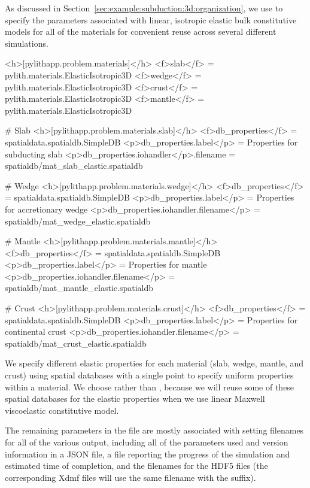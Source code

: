 As discussed in Section~\vref{sec:example:subduction:3d:organization},
we use  to specify the parameters
associated with linear, isotropic elastic bulk constitutive models for
all of the materials for convenient reuse across several different
simulations.
\begin{cfg}
<h>[pylithapp.problem.materials]</h>
<f>slab</f> = pylith.materials.ElasticIsotropic3D
<f>wedge</f> = pylith.materials.ElasticIsotropic3D
<f>crust</f> = pylith.materials.ElasticIsotropic3D
<f>mantle</f> = pylith.materials.ElasticIsotropic3D

# Slab
<h>[pylithapp.problem.materials.slab]</h>
<f>db_properties</f> = spatialdata.spatialdb.SimpleDB
<p>db_properties.label</p> = Properties for subducting slab
<p>db_properties.iohandler</p>.filename = spatialdb/mat_slab_elastic.spatialdb

# Wedge
<h>[pylithapp.problem.materials.wedge]</h>
<f>db_properties</f> = spatialdata.spatialdb.SimpleDB
<p>db_properties.label</p> = Properties for accretionary wedge
<p>db_properties.iohandler.filename</p> = spatialdb/mat_wedge_elastic.spatialdb

# Mantle
<h>[pylithapp.problem.materials.mantle]</h>
<f>db_properties</f> = spatialdata.spatialdb.SimpleDB
<p>db_properties.label</p> = Properties for mantle
<p>db_properties.iohandler.filename</p> = spatialdb/mat_mantle_elastic.spatialdb

# Crust
<h>[pylithapp.problem.materials.crust]</h>
<f>db_properties</f> = spatialdata.spatialdb.SimpleDB
<p>db_properties.label</p> = Properties for continental crust
<p>db_properties.iohandler.filename</p> = spatialdb/mat_crust_elastic.spatialdb
\end{cfg}
We specify different elastic properties for each material
(slab, wedge, mantle, and crust) using  spatial
databases with a single point to specify uniform properties within a
material. We choose  rather than ,
because we will reuse some of these spatial databases for the elastic
properties when we use linear Maxwell viscoelastic constitutive model.

The remaining parameters in the  file are mostly
associated with setting filenames for all of the various output,
including all of the parameters used and version information in a JSON
file, a file reporting the progress of the simulation and estimated
time of completion, and the filenames for the HDF5 files (the
corresponding Xdmf files will use the same filename with the
 suffix).

